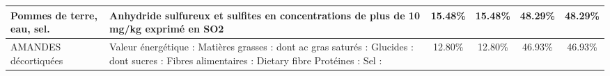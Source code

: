 \begin{tabular}{p{5cm}p{5cm}cccc}
                                                                                                                                                                                                                                                               Pommes de terre, eau, sel. &                                                                                                                                                                                                                                  Anhydride sulfureux et sulfites en  \newline concentrations de plus de 10 mg/kg  \newline exprimé en SO2 &  15.48\% &  15.48\% &  48.29\% &   48.29\% \\ \hline
                                                                                                                                                                                                                                                                     AMANDES décortiquées &                                                                                                       Valeur énergétique :  \newline      Matières grasses :   \newline           dont ac gras saturés :  \newline      Glucides :  \newline           dont sucres :   \newline      Fibres alimentaires :        Dietary fibre  \newline      Protéines :  \newline      Sel :   &  12.80\% &  12.80\% &  46.93\% &   46.93\% \\ \hline

\end{tabular}
